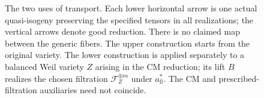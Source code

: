 \begin{figure}[tbp]
\centering

\caption{The two uses of transport. Each lower horizontal arrow is one
actual quasi-isogeny preserving the specified tensors in all
realizations; the vertical arrows denote good reduction. There is no
claimed map between the generic fibers. The upper construction starts
from the original variety. The lower construction is applied separately
to a balanced Weil variety \(Z\) arising in the CM reduction; its lift
\(B\) realizes the chosen filtration \(\mathcal F_Z^{\oplus m}\) under
\(a_{\mathrm{fl}}^*\). The CM and prescribed-filtration auxiliaries need
not coincide.}
\label{fig:two-transports}
\end{figure}

